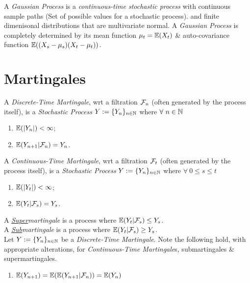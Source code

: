 \documentclass[11pt,a4paper]{article}
\begin{document}
A \textit{Gaussian Process} is a \textit{continuous-time stochastic process} with continuous sample paths (Set of possible values for a stochastic process). and finite dimenisonal distributions that are multivariate normal. A \textit{Gaussian Process} is completely determined by its mean function $\mu_t=\mathbb{E}(X_t)$ \& auto-covariance function $\mathbb{E}((X_s-\mu_s)(X_t-\mu_t))$.\\

\section{Martingales}

A \textit{Discrete-Time Martingale}, wrt a filtration $\mathcal{F}_n$ (often generated by the process itself), is a \textit{Stochastic Process} $Y:=\{Y_n\}_{n\in\mathbb{N}}$ where $\forall\ n\in\mathbb{N}$
\begin{enumerate}
	\item $\mathbb{E}(|Y_n|)<\infty$;
	\item $\mathbb{E}(Y_{n+1}|\mathcal{F}_n)=Y_n$.
\end{enumerate}

A \textit{Continuous-Time Martingale}, wrt a filtration $\mathcal{F}_t$ (often generated by the process itself), is a \textit{Stochastic Process} $Y:=\{Y_n\}_{n\in\mathbb{N}}$ where $\forall\ 0\leq s\leq t$
\begin{enumerate}
	\item $\mathbb{E}(|Y_t|)<\infty$;
	\item $\mathbb{E}(Y_t|\mathcal{F}_s)=Y_s$.
\end{enumerate}

A \textit{\underline{Super}martingale} is a process where $\mathbb{E}(Y_t|\mathcal{F}_s)\leq Y_s$.\\
A \textit{\underline{Sub}martingale} is a process where $\mathbb{E}(Y_t|\mathcal{F}_s)\geq Y_s$.\\

Let $Y:=\{Y_n\}_{n\in\mathbb{N}}$ be a \textit{Discrete-Time Martingale}. Note the following hold, with appropriate alterations, for \textit{Continuous-Time Martingale}s, submartingales \& supermartingales.
\begin{enumerate}
	\item $\mathbb{E}(Y_{n+1})=\mathbb{E}(\mathbb{E}(Y_{n+1}|\mathcal{F}_n))=\mathbb{E}(Y_n)$
\end{enumerate}
\end{document}
